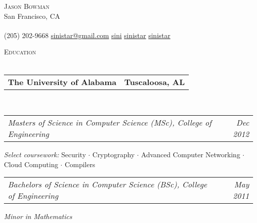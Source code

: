 \documentclass[10pt,letterpaper]{article}
\makeatletter
\newcommand{\area}[2]{\emph{#1:}   #2}
\newcommand{\lineunder}{\vspace*{-8pt} \\ \hspace*{-18pt} \hrulefill \\}
\newcommand{\header}[1]{{\hspace*{-15pt}\vspace*{6pt} \textsc{#1}} \vspace*{-6pt} \lineunder}
\newcommand{\contact}[3]{
\vspace*{-8pt}
\begin{center}
{\LARGE \scshape {#1}}\\
#2 \lineunder 
#3
\end{center}
\vspace*{-8pt}
}
\newcommand{\headerrow}[2]
{\begin{tabular*}{\linewidth}{l@{\extracolsep{\fill}}r}
	#1 &
	#2 \\
\end{tabular*}}
\newcommand{\education}[5]{
	\headerrow
		{\textbf{#1}}
		{\textbf{#2}}
	\\
	\headerrow
		{\emph{#3}}
		{\emph{#4}}
    #5
}
\makeatother
\begin{document}
\small
\smallskip
\vspace*{-30pt}

\contact{Jason Bowman}
{San Francisco, CA}
{\faPhone \hspace{0.1em} (205) 202-9668 \hspace{0.1em} \faEnvelope \hspace{0.1em}
  \href{mailto:sinistar@gmail.com}{sinistar@gmail.com} \hspace{0.1em} \faGithub \hspace{0.1em} \href{https://www.github.com/sini}{sini} \hspace{0.1em} \faTwitter
  \hspace{0.1em} \href{https://www.twitter.com/sinistar}{sinistar} \hspace{0.1em} \faLinkedin \hspace{0.1em}
  \href{https://linkedin.com/in/sinistar}{sinistar}}

\vspace*{3pt}

\header{Education}
\education{The University of Alabama}{Tuscaloosa, AL}{Masters of Science in
  Computer Science (MSc), College of Engineering}{Dec 2012}{
	\begin{itemize*}
		\item \area{Select
    coursework}{Security $\cdot$ Cryptography $\cdot$ Advanced Computer
    Networking $\cdot$ Cloud Computing $\cdot$ Compilers}
	\end{itemize*}
	\headerrow{\emph{Bachelors of Science in Computer Science (BSc), College of
      Engineering}}{\emph{May 2011}}
	\begin{itemize*}
  \item \emph{Minor in Mathematics}
	\end{itemize*}
}

\end{document}
